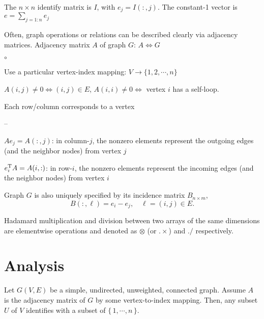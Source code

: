\vspace{2em} 
\noindent 
The $n\times n$ identify matrix is $I$, with 
$e_j = I(:,j)$. The constant-1 vector is $e=\sum_{j=1:n}e_j$

\vspace{2em}
\noindent
Often, graph operations or relations can be described clearly via
adjacency matrices. Adjacency matrix $A$ of graph $G$: $A\iff G$
% 
\begin{list}{$\circ$}{} %
  {\setlength{\leftmargin}{1em}}
\item Use a particular vertex-index mapping:
  $V \to \{ 1, 2, \cdots, n \}$
\item $A(i,j) \neq 0 \iff (i,j) \in E$,
  $A(i,i) \neq 0 \iff $ vertex $i$ has a self-loop. 
\item Each row/column corresponds to a vertex
  \begin{list}{--}{}%
  \item $Ae_j=A(:,j)$: in column-$j$, 
    the nonzero elements represent the
    outgoing edges (and the neighbor nodes) from vertex $j$
  \item $e_{i}^{\rm T}A = A(i,:)$: in row-$i$, 
    the nonzero elements represent the
    incoming edges (and the neighbor nodes) from vertex $i$
  \end{list} 
\end{list}

\vspace{2em}
\noindent
Graph $G$ is also uniquely specified by its incidence matrix $B_{n\times m}$, 
\begin{equation}
  \label{eq:incidence-matrix}
  B(:, \ell) = e_i - e_j,
  \quad \ell = (i,j) \in E. 
\end{equation}

\vspace{2em} Hadamard multiplication and division between two arrays of
the same dimensions are elementwise operations and denoted as
$\otimes$ (or $.\times$) and $./$ respectively.

  
\newpage

\section*{Analysis}

Let $G(V,E)$ be a simple, undirected, unweighted, connected graph.
Assume $A$ is the adjacency matrix of $G$ by some vertex-to-index
mapping. Then, any subset $U$ of $V$ identifies with a subset of
$\{\, 1,\cdots, n\, \}$.

